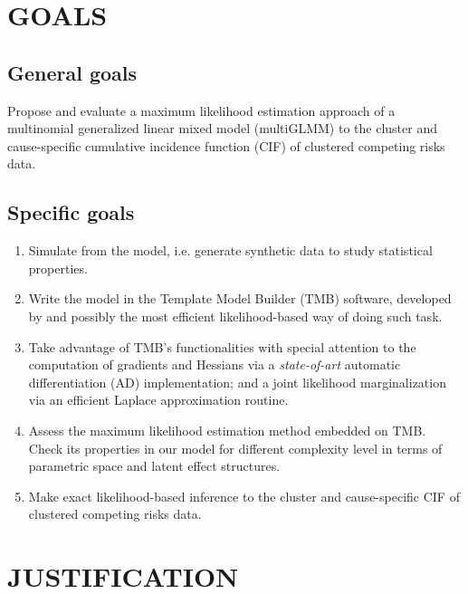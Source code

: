 \section{GOALS}

\subsection{General goals}

Propose and evaluate a maximum likelihood estimation approach of a
multinomial generalized linear mixed model (multiGLMM) to the cluster
and cause-specific cumulative incidence function (CIF) of clustered
competing risks data.

\subsection{Specific goals}

\begin{enumerate}
 \item Simulate from the model, i.e. generate synthetic data to study
       statistical properties.

 \item Write the model in the Template Model Builder (TMB) software,
       developed by  and possibly the most efficient
       likelihood-based way of doing such task.

 \item Take advantage of TMB's functionalities with special attention to
       the computation of gradients and Hessians via a
       \textit{state-of-art} automatic differentiation (AD)
       implementation; and a joint likelihood marginalization via an
       efficient Laplace approximation routine.

 \item Assess the maximum likelihood estimation method embedded on TMB.
       Check its properties in our model for different complexity level
       in terms of parametric space and latent effect structures.

 \item Make exact likelihood-based inference to the cluster and
       cause-specific CIF of clustered competing risks data.
\end{enumerate}

\section{JUSTIFICATION}


